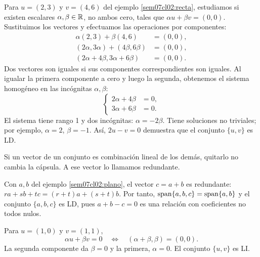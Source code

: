 \documentclass[compacto,10pt]{pubciencias-notas}
\begin{document}
\begin{ejem}
    Para $u=(2,3)$ y $v=(4,6)$ del ejemplo \ref{sem07cl02:recta},
    estudiamos si existen escalares $\alpha,\beta\in\mathbb{R}$, no ambos cero,
    tales que $\alpha u+\beta v=(0,0)$. Sustituimos los vectores y
    efectuamos las operaciones por componentes:
    \[
        \begin{aligned}
            \alpha(2,3)+\beta(4,6)&=(0,0),\\
            (2\alpha,3\alpha)+(4\beta,6\beta)&=(0,0),\\
            (2\alpha+4\beta,3\alpha+6\beta)&=(0,0).
        \end{aligned}
    \]
    Dos vectores son iguales si sus componentes correspondientes son
    iguales. Al igualar la primera componente a cero y luego la segunda,
    obtenemos el sistema homogéneo en las incógnitas $\alpha,\beta$:
    \[
        \left\{\begin{aligned}2\alpha+4\beta&=0,\\3\alpha+6\beta&=0.\end{aligned}\right.
    \]
    El sistema tiene rango 1 y dos incógnitas: $\alpha=-2\beta$.
    Tiene soluciones no triviales; por ejemplo, $\alpha=2$, $\beta=-1$.
    Así, $2u-v=0$ demuestra que el conjunto $\{u,v\}$ es LD.
\end{ejem}

\begin{prop}\label{sem07cl02:redundante}
    Si un vector de un conjunto es combinación lineal de los demás,
    quitarlo no cambia la cápsula. A ese vector lo llamamos redundante.
\end{prop}

Con $a,b$ del ejemplo \ref{sem07cl02:plano}, el vector $c=a+b$ es redundante:
$ra+sb+tc=(r+t)a+(s+t)b$. Por tanto,
$\operatorname{span}\{a,b,c\}=\operatorname{span}\{a,b\}$ y el conjunto $\{a,b,c\}$ es LD, pues
$a+b-c=0$ es una relación con coeficientes no todos nulos.

\begin{ejem}
    Para $u=(1,0)$ y $v=(1,1)$,
    \[
        \alpha u+\beta v=0
        \quad\Longleftrightarrow\quad
        (\alpha+\beta,\beta)=(0,0).
    \]
    La segunda componente da $\beta=0$ y la primera, $\alpha=0$.
    El conjunto $\{u,v\}$ es LI.
\end{ejem}
\end{document}
